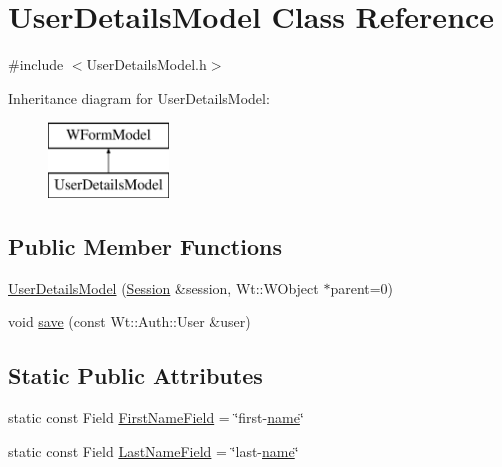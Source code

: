 \hypertarget{class_user_details_model}{}\section{User\+Details\+Model Class Reference}
\label{class_user_details_model}


{\ttfamily \#include $<$User\+Details\+Model.\+h$>$}

Inheritance diagram for User\+Details\+Model\+:\begin{figure}[H]
\begin{center}
\leavevmode
\includegraphics[height=2.000000cm]{class_user_details_model}
\end{center}
\end{figure}
\subsection*{Public Member Functions}
\begin{DoxyCompactItemize}
\item 
\hyperlink{class_user_details_model_aac16af78a18e4a99a6666d85914af5d5}{User\+Details\+Model} (\hyperlink{class_session}{Session} \&session, Wt\+::\+W\+Object $\ast$parent=0)
\item 
void \hyperlink{class_user_details_model_a0216d9fc37c8528a5fd49756529d4f57}{save} (const Wt\+::\+Auth\+::\+User \&user)
\end{DoxyCompactItemize}
\subsection*{Static Public Attributes}
\begin{DoxyCompactItemize}
\item 
static const Field \hyperlink{class_user_details_model_a5106e62fceceff6333718c1c88cee6cf}{First\+Name\+Field} = \char`\"{}first-\/\hyperlink{_bridge_control_8_c_a8ccf841cb59e451791bcb2e1ac4f1edc}{name}\char`\"{}
\item 
static const Field \hyperlink{class_user_details_model_a1d1e2d4300151876ed221b080860b004}{Last\+Name\+Field} = \char`\"{}last-\/\hyperlink{_bridge_control_8_c_a8ccf841cb59e451791bcb2e1ac4f1edc}{name}\char`\"{}
\end{DoxyCompactItemize}
